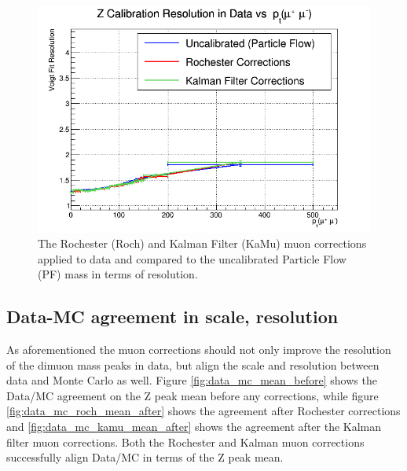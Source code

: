 \begin{figure}[hbp]
  \includegraphics[width=0.32\linewidth]{figures/muon_calib/zcal_data_res_dimu_pt.png}
  \caption
   {The Rochester (Roch) and Kalman Filter (KaMu) muon corrections applied to data and compared to the uncalibrated Particle Flow (PF) mass in terms of resolution.}
  \label{fig:net_data_mu_calib_res}
\end{figure}

\subsection{Data-MC agreement in scale, resolution}

As aforementioned the muon corrections should not only improve the resolution of the dimuon mass peaks in data, but align the scale and resolution between data and Monte Carlo as well. Figure \ref{fig:data_mc_mean_before} shows the Data/MC agreement on the Z peak mean before any corrections, while figure \ref{fig:data_mc_roch_mean_after} shows the agreement after Rochester corrections and \ref{fig:data_mc_kamu_mean_after} shows the agreement after the Kalman filter muon corrections. Both the Rochester and Kalman muon corrections successfully align Data/MC in terms of the Z peak mean.

